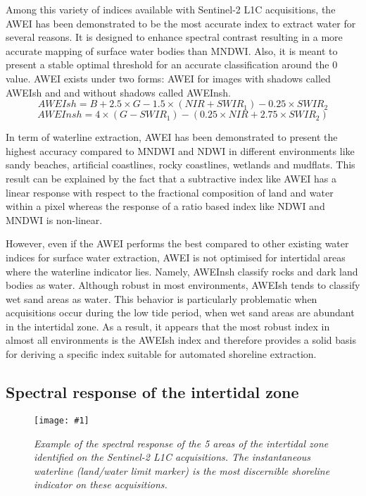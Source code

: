 \documentclass[remotesensing,article,submit,pdftex,moreauthors]{Definitions/mdpi}
\newcommand{\myfigure}[4]{
    \begin{figure*}[h!]
        \centering
        \texttt{[image: \#1]}	 
        \caption{\itshape#2}
        \label{#3}
    \end{figure*} 
}
\begin{document}
Among this variety of indices available with Sentinel-2 L1C acquisitions, the AWEI has been demonstrated to be the most accurate index to extract water for several reasons.
It is designed to enhance spectral contrast resulting in a more accurate mapping of surface water bodies than MNDWI.
Also, it is meant to present a stable optimal threshold for an accurate classification around the 0 value.
AWEI exists under two forms: AWEI for images with shadows called AWEIsh and and without shadows called AWEInsh. \citep{FEYISA201423}
\begin{equation}
    AWEIsh = B + 2.5 \times G - 1.5 \times (NIR + SWIR_1) - 0.25 \times SWIR_2
\end{equation}
\begin{equation}
    AWEInsh = 4\times( G - SWIR_1) - (0.25 \times NIR + 2.75 \times SWIR_2)
\end{equation}

In term of waterline extraction, AWEI has been demonstrated to present the highest accuracy compared to MNDWI and NDWI in different environments like sandy beaches, artificial coastlines, rocky coastlines, wetlands and mudflats.
This result can be explained by the fact that a subtractive index like AWEI has a linear response with respect to the fractional composition of land and water within a pixel whereas the response of a ratio based index like NDWI and MNDWI is non-linear. \citep{Bishop_sub_pixel}

However, even if the AWEI performs the best compared to other existing water indices for surface water extraction, AWEI is not optimised for intertidal areas where the waterline indicator lies.
Namely, AWEInsh classify rocks and dark land bodies as water.
Although robust in most environments, AWEIsh tends to classify wet sand areas as water.
This behavior is particularly problematic when acquisitions occur during the low tide period, when wet sand areas are abundant in the intertidal zone.
As a result, it appears that the most robust index in almost all environments is the AWEIsh index and therefore provides a solid basis for deriving a specific index suitable for automated shoreline extraction.

\subsection{Spectral response of the intertidal zone}

\myfigure{img/band_compare_CAPBRETON.png}{Example of the spectral response of the 5 areas of the intertidal zone identified on the Sentinel-2 L1C acquisitions. The instantaneous waterline (land/water limit marker) is the most discernible shoreline indicator on these acquisitions.}{band_compare}{1}
\end{document}
